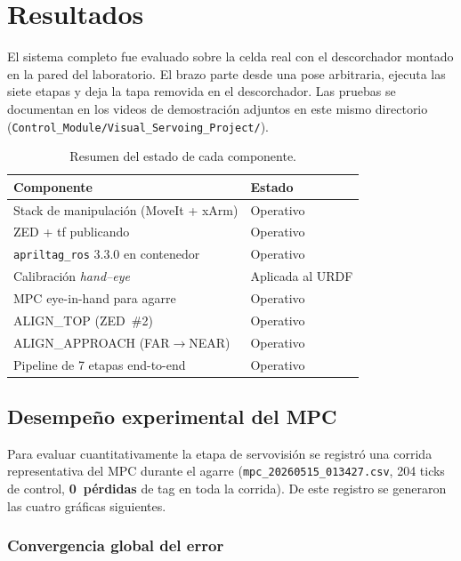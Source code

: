 \documentclass[conference]{IEEEtran}
\begin{document}
\section{Resultados}

El sistema completo fue evaluado sobre la celda real con el
descorchador montado en la pared del laboratorio. El brazo parte
desde una pose arbitraria, ejecuta las siete etapas y deja la tapa
removida en el descorchador. Las pruebas se documentan en los videos
de demostraci\'on adjuntos en este mismo directorio
(\texttt{Control\_Module/Visual\_Servoing\_Project/}).

\begin{table}[h]
\centering
\caption{Resumen del estado de cada componente.}
\label{tab:status}
\begin{tabular}{ll}
\toprule
Componente & Estado \\
\midrule
Stack de manipulaci\'on (MoveIt + xArm) & Operativo \\
ZED + tf publicando & Operativo \\
\texttt{apriltag\_ros} 3.3.0 en contenedor & Operativo \\
Calibraci\'on \emph{hand--eye} & Aplicada al URDF \\
MPC eye-in-hand para agarre & Operativo \\
ALIGN\_TOP (ZED~\#2) & Operativo \\
ALIGN\_APPROACH (FAR$\rightarrow$NEAR) & Operativo \\
Pipeline de 7 etapas end-to-end & Operativo \\
\bottomrule
\end{tabular}
\end{table}

\subsection{Desempe\~no experimental del MPC}

Para evaluar cuantitativamente la etapa de servovisi\'on se registr\'o
una corrida representativa del MPC durante el agarre
(\texttt{mpc\_20260515\_013427.csv}, 204 ticks de control,
\textbf{0~p\'erdidas} de tag en toda la corrida). De este registro
se generaron las cuatro gr\'aficas siguientes.

\subsubsection{Convergencia global del error}
\end{document}
